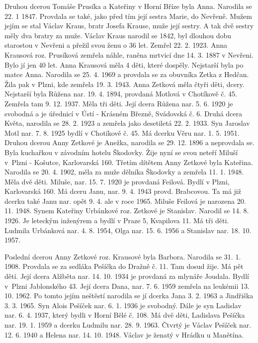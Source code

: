 \documentclass[../dejiny-rodu-prusiku.tex]{subfiles}
\begin{document}
Druhou dcerou Tomáše Prusíka a Kateřiny v Horní Bříze byla Anna. Narodila se 22. 1 1847. Provdala se také, jako před tím její sestra Marie,  do Nevřeně. Mu­žem jejím se stal Václav Kraus, bratr Josefa Krause, muže její sestry. A tak dvě sestry měly dva bratry za muže. Václav Kraus narodil se 1842, byl dlouhou dobu starostou v Nevřeni a přežil svou ženu o 36 let. Zemřel 22. 2. 1923. Anna Krausová roz. Prusíková zemřela náhle, raněna mrtvicí dne 14. 3. 1887 v Nevřeni. Bylo jí jen 40 let. Anna Krausová měla 4 děti, které dospěly. Nejstarší byla po matce Anna. Narodila se 25. 4. 1969 a provdala se za obuvníka Zetka z Hedčan. Žila pak v Plzni, kde zemřela 19. 3. 1943. Anna Zetková měla čtyři děti, dcery. Nejstarší byla Růžena nar. 19. 4. 1894, provdaná Motlová v Chotíkově č. 45. Zemřela tam 9. 12. 1937. Měla tři děti. Její dcera Růžena nar. 5. 6. 1920 je svobodná a je úřednicí v Ústí - Krásném Březně, Svádovská č. 6. Druhá dcera Květa, narodila se 28. 2. 1923 a zemřela jako dese­tiletá 22. 2. 1933. Syn Jaroslav Motl nar. 7. 8. 1925 bydlí v Chotíkově č. 45. Má dcerku Věru nar. 1. 5. 1951. Druhou dcerou Anny Zetkové je Anežka, narodila se 29. 12. 1896 a neprovdala se. Byla kuchařkou v závodním hotelu Škodovky. Žije nyní se svou neteří Miluší v Plzni - Košutce, Karlo­varská 160. Třetím dítětem Anny Zetkové byla Kateřina. Narodila se 20. 4. 1902, měla za muže dělníka Škodovky a zemřela 11. 1. 1948. Měla dvě děti. Miluše, nar. 15. 7. 1920 je provdaná Feilová. Bydlí v Plzni, Karlovarská 160. Má dceru Janu, nar. 9. 4. 1943 provd. Brabcovou. Ta má již dcerku také Janu nar. opět 9. 4.  ale v roce 1965. Miluše Feilová je narozena 20. 11. 1948. Synem Kateřiny Urbánkové roz. Zetkové je Stanislav. Narodil se 14. 8. 1926. Je leteckým inženýrem a bydlí v Praze 5,  Kvapilova 11. Má tři děti. Ludmila Urbánková nar. 4. 8. 1954, Olga nar. 15. 6. 1956 a Stanislav nar. 18. 10. 1957.

Poslední dcerou Anny Zetkové roz. Krausové byla Barbora. Narodila se 31. 1. 1908. Provdala se za sedláka Pešíčka do Dražně č. 11. Tam dosud žije. Má pět dětí. Její dcera Alžběta nar. 14. 10. 1934 je provdaná za mlynáře Joudala. Bydlí v Plzni Jablonského 43. Její dcera Dana, nar. 7. 6. 1959 zemřela na leukémii 13. 10. 1962. Po tomto jejím neštěstí narodila se jí dcerka Jana 3. 2. 1963 a Jindřiška 3. 3. 1965. Syn Alois Pešíček nar. 6. 1. 1936 je svobodný. Dále je syn Ladislav nar. 6. 4. 1937, který bydli v Horní Bělé č. 108. Má dvě děti, Ladislava Pešíčka  nar. 19. 1. 1959 a dcerku Ludmilu nar. 28. 9. 1963. Čtvrtý je Václav Pešíček nar. 12. 6. 1940 a Helena nar. 14. 10. 1948. Václav je ženatý v Hrádku u Manětína.
\end{document}
